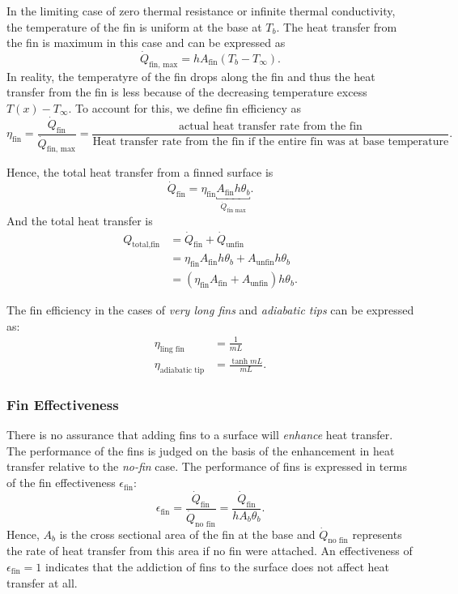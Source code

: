 In the limiting case of zero thermal resistance or infinite thermal conductivity, the temperature of the fin is uniform at the base at $T_b$.
The heat transfer from the fin is maximum in this case and can be expressed as
\begin{equation*}
  \dot{Q}_{\text{fin, max}}  = h A_{\text{fin}} (T_b - T_{\infty})
.\end{equation*}
In reality, the temperatyre of the fin drops along the fin and thus the heat transfer from the fin is less because of the decreasing temperature excess $T(x) - T_{\infty}$.
To account for this, we define fin efficiency as
\begin{equation*}
  \eta_{\text{fin}} = \frac{\dot{Q}_{\text{fin}}}{\dot{Q}_{\text{fin, max}}} = \frac{\text{actual heat transfer rate from the fin}}{\text{Heat transfer rate from the fin if the entire fin was at base temperature}}
.\end{equation*}

Hence, the total heat transfer from a finned surface is
\begin{equation*}
  \dot{Q}_{\text{fin}} = \eta_{\text{fin}} \underbracket{A_{\text{fin}} h \theta_b}_{\dot{Q}_{\text{fin max}}}
.\end{equation*}
And the total heat transfer is
\begin{align*}
  Q_{\text{total,fin}} &= \dot{Q}_{\text{fin}} + \dot{Q}_{\text{unfin}} \\
  &= \eta_{\text{fin}} A_{\text{fin}} h \theta_b + A_{\text{unfin}} h \theta_b \\
  &= \left( \eta_{\text{fin}} A_{\text{fin}} + A_{\text{unfin}} \right) h \theta_b
.\end{align*}

The fin efficiency in the cases of \textit{very long fins} and \textit{adiabatic tips} can be expressed as:
\begin{align*}
  \eta_{\text{ling fin}} &= \frac{1}{mL} \\
  \eta_{\text{adiabatic tip}} &= \frac{\tanh mL}{mL}
.\end{align*}


\subsubsection{Fin Effectiveness}
There is no assurance that adding fins to a surface will \textit{enhance} heat transfer.
The performance of the fins is judged on the basis of the enhancement in heat transfer relative to the \textit{no-fin} case.
The performance of fins is expressed in terms of the fin effectiveness $\epsilon_{\text{fin}}$:
\begin{equation*}
  \epsilon_{\text{fin}} = \frac{\dot{Q}_{\text{fin}}}{\dot{Q}_{\text{no fin}}} = \frac{\dot{Q}_{\text{fin}}}{h A_b \theta_b}
.\end{equation*}
Hence, $A_b$ is the cross sectional area of the fin at the base and $\dot{Q}_{\text{no fin}}$ represents the rate of heat transfer from this area if no fin were attached.
An effectiveness of $\epsilon_{\text{fin}} = 1$ indicates that the addiction of fins to the surface does not affect heat transfer at all.

